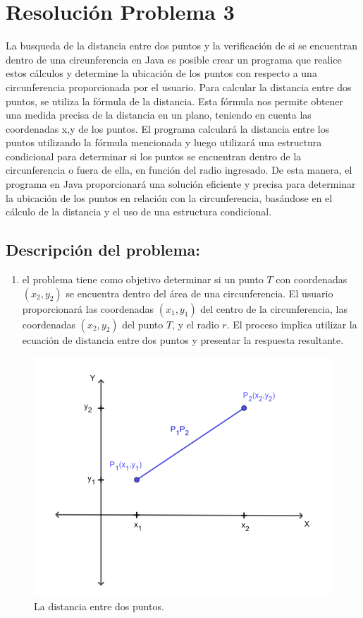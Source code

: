 \section{Resolución Problema 3}
La busqueda de la distancia entre dos puntos y la verificación de si se encuentran dentro de una circunferencia en Java es posible crear un programa que realice estos cálculos y determine la ubicación de los puntos con respecto a una circunferencia proporcionada por el usuario.
Para calcular la distancia entre dos puntos, se utiliza la fórmula de la distancia. Esta fórmula nos permite obtener una medida precisa de la distancia en un plano, teniendo en cuenta las coordenadas x,y de los puntos.
El programa calculará la distancia entre los puntos utilizando la fórmula mencionada y luego utilizará una estructura condicional para determinar si los puntos se encuentran dentro de la circunferencia o fuera de ella, en función del radio ingresado.
De esta manera, el programa en Java proporcionará una solución eficiente y precisa para determinar la ubicación de los puntos en relación con la circunferencia, basándose en el cálculo de la distancia y el uso de una estructura condicional.
\subsection{\textbf{Descripción del problema:}}
\begin{enumerate}
    \item el problema tiene como objetivo determinar si un punto $T$ con coordenadas $(x_{2}, y_{2})$ se encuentra dentro del área de una circunferencia. El usuario proporcionará las coordenadas $(x_{1}, y_{1})$ del centro de la circunferencia, las coordenadas $(x_{2}, y_{2})$ del punto $T$, y el radio $r$. El proceso implica utilizar la ecuación de distancia entre dos puntos y presentar la respuesta resultante.
\end{enumerate}
\begin{figure}[h!]
    \centering
    \includegraphics[width=1\linewidth]{LaTeX//latex-imagenes/Distancia_entre_dos_puntos-2-768x615.png}
    \caption{La distancia entre dos puntos.}
    \label{fig:enter-label}
\end{figure}

